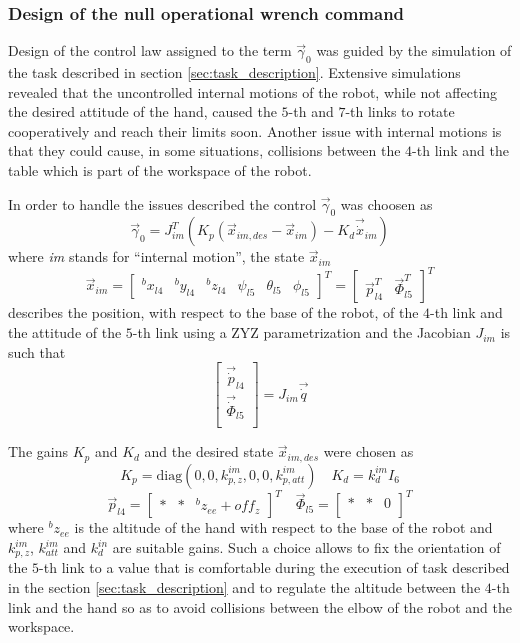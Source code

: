 \subsubsection{Design of the null operational wrench command}
Design of the control law assigned to the term $\vec{\gamma}_{0}$ was
guided by the simulation of the task described in section \ref{sec:task_description}. Extensive simulations
revealed that the uncontrolled internal motions of the robot, while not affecting the desired
attitude of the hand, caused the $5$-th and $7$-th links to rotate cooperatively and reach
their limits soon. Another issue with internal motions is that they could cause, in some situations,
collisions between the $4$-th link and the table which is part of the workspace of the robot.
\par
In order to handle the issues described the control $\vec{\gamma}_0$ was choosen as
\[
\vec{\gamma}_{0} = J_{im} ^{T} (K_p (\vec{x}_{im,des} - \vec{x}_{im} ) - K_d \vec{\dot{x}}_{im})
\]
where \emph{im} stands for ``internal motion'', the state $\vec{x}_{im}$
\[
\vec{x}_{im} =
\begin{bmatrix}
  {}^{b} x_{l4} & {}^{b} y_{l4} & {}^{b} z_{l4} & \psi_{l5} & \theta_{l5} & \phi_{l5}
\end{bmatrix}^{T} =
\begin{bmatrix}
  \vec{p}^{T}_{l4} & \vec{\Phi}^{T}_{l5}
\end{bmatrix}^{T}
\]
describes the position, with respect to the base of the robot, of the $4$-th link
and the attitude of the $5$-th link using a ZYZ parametrization and the Jacobian
$J_{im}$ is such that
\[
\begin{bmatrix}
  \vec{\dot{p}}_{l4} \\
  \vec{\dot{\Phi}}_{l5} \\
\end{bmatrix} =
J_{im} \vec{\dot{q}}
\]
\par
The gains $K_p$ and $K_d$ and the desired state $\vec{x}_{im,des}$ were chosen as
\[
K_p = \text{diag}(0, 0, k_{p,z}^{im}, 0, 0, k_{p, att}^{im})
\quad
K_d = k_{d}^{im} I_{6}
\]
\[
\vec{p}_{l4} =
\begin{bmatrix}
  * & * & {}^{b} z_{ee} + off_z
\end{bmatrix}^{T}
\quad
\vec{\Phi}_{l5} =
\begin{bmatrix}
  * & * & 0\\
\end{bmatrix}^{T}
\]
where ${}^{b} z_{ee}$ is the altitude of the hand with respect to the base of the robot
and $k_{p,z}^{im}$, $k_{att}^{im}$ and $k_{d}^{in}$ are suitable gains.
Such a choice allows to fix the orientation of the $5$-th link to a value that is comfortable
during the execution of task described in the section \ref{sec:task_description} and to regulate the altitude between the $4$-th link and
the hand so as to avoid collisions between the elbow of the robot and the workspace.
\newpage
